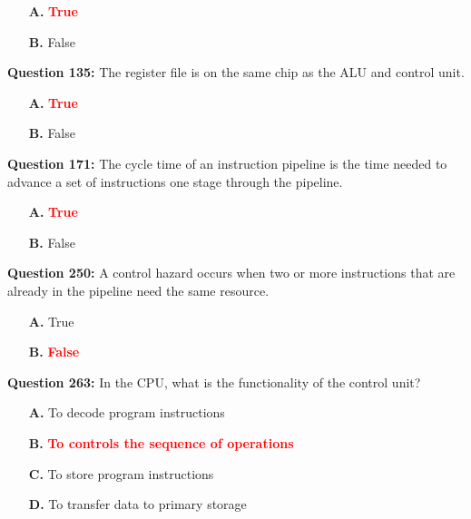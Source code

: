 \documentclass[12pt,a4paper]{article}
\begin{document}
\begin{itemize}
    \item[\textbf{A.}] \textcolor{red}{\textbf{True}}
    \item[\textbf{B.}] False
\end{itemize}

\vspace{0.5cm}

\textbf{Question 135:} The register file is on the same chip as the ALU and control unit.

\begin{itemize}
    \item[\textbf{A.}] \textcolor{red}{\textbf{True}}
    \item[\textbf{B.}] False
\end{itemize}

\vspace{0.5cm}

\textbf{Question 171:} The cycle time of an instruction pipeline is the time needed to advance a set of instructions one stage through the pipeline.

\begin{itemize}
    \item[\textbf{A.}] \textcolor{red}{\textbf{True}}
    \item[\textbf{B.}] False
\end{itemize}

\vspace{0.5cm}

\textbf{Question 250:} A control hazard occurs when two or more instructions that are already in the pipeline need the same resource.

\begin{itemize}
    \item[\textbf{A.}] True
    \item[\textbf{B.}] \textcolor{red}{\textbf{False}}
\end{itemize}

\vspace{0.5cm}

\textbf{Question 263:} In the CPU, what is the functionality of the control unit?

\begin{itemize}
    \item[\textbf{A.}] To decode program instructions
    \item[\textbf{B.}] \textcolor{red}{\textbf{To controls the sequence of operations}}
    \item[\textbf{C.}] To store program instructions
    \item[\textbf{D.}] To transfer data to primary storage
\end{itemize}
\end{document}

